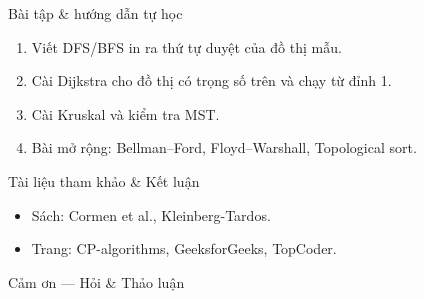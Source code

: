 \documentclass{beamer}
\newcommand{\hlblue}[1]{\textcolor{myblue}{#1}}
\newcommand{\hlgreen}[1]{\textcolor{mygreen}{#1}}
\newcommand{\hlred}[1]{\textcolor{myred}{#1}}
\newcommand{\hlpurple}[1]{\textcolor{mypurple}{#1}}
\newcommand{\hlorange}[1]{\textcolor{myorange}{#1}}
\newcommand{\hlcyan}[1]{\textcolor{mycyan}{#1}}
\begin{document}
\begin{frame}{\hlcyan{Bài tập \& hướng dẫn tự học}}
\begin{enumerate}
\item Viết \hlblue{DFS/BFS} in ra thứ tự duyệt của đồ thị mẫu.
\item Cài \hlorange{Dijkstra} cho đồ thị có trọng số trên và chạy từ đỉnh \hlblue{1}.
\item Cài \hlpurple{Kruskal} và kiểm tra MST.
\item Bài mở rộng: \hlred{Bellman–Ford}, \hlred{Floyd–Warshall}, \hlred{Topological sort}.
\end{enumerate}
\end{frame}

\begin{frame}{\hlgreen{Tài liệu tham khảo \& Kết luận}}
\begin{itemize}
\item Sách: \hlblue{Cormen et al.}, \hlblue{Kleinberg-Tardos}.
\item Trang: \hlpurple{CP-algorithms}, \hlpurple{GeeksforGeeks}, \hlpurple{TopCoder}.
\end{itemize}

\bigskip
\centerline{\hlorange{Cảm ơn — Hỏi \& Thảo luận}}
\end{frame}
\end{document}

